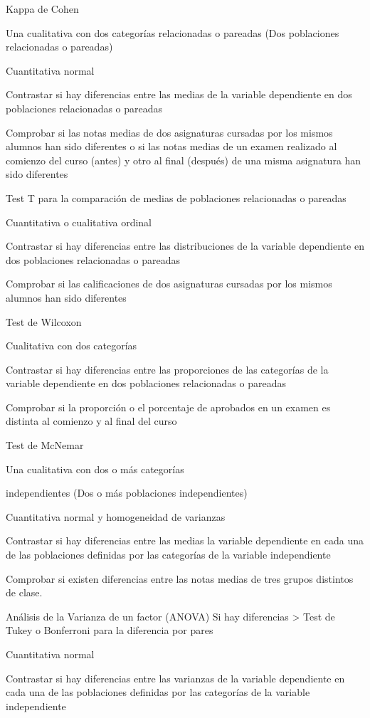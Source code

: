 \documentclass[
  a4paper,
]{scrreport}
\theoremstyle{definition}
\theoremstyle{definition}
\theoremstyle{remark}
\begin{document}
Kappa de Cohen

Una cualitativa con dos categorías relacionadas o pareadas (Dos
poblaciones relacionadas o pareadas)

Cuantitativa normal

Contrastar si hay diferencias entre las medias de la variable
dependiente en dos poblaciones relacionadas o pareadas

Comprobar si las notas medias de dos asignaturas cursadas por los mismos
alumnos han sido diferentes o si las notas medias de un examen realizado
al comienzo del curso (antes) y otro al final (después) de una misma
asignatura han sido diferentes

Test T para la comparación de medias de poblaciones relacionadas o
pareadas

Cuantitativa o cualitativa ordinal

Contrastar si hay diferencias entre las distribuciones de la variable
dependiente en dos poblaciones relacionadas o pareadas

Comprobar si las calificaciones de dos asignaturas cursadas por los
mismos alumnos han sido diferentes

Test de Wilcoxon

Cualitativa con dos categorías

Contrastar si hay diferencias entre las proporciones de las categorías
de la variable dependiente en dos poblaciones relacionadas o pareadas

Comprobar si la proporción o el porcentaje de aprobados en un examen es
distinta al comienzo y al final del curso

Test de McNemar

Una cualitativa con dos o más categorías

independientes (Dos o más poblaciones independientes)

Cuantitativa normal y homogeneidad de varianzas

Contrastar si hay diferencias entre las medias la variable dependiente
en cada una de las poblaciones definidas por las categorías de la
variable independiente

Comprobar si existen diferencias entre las notas medias de tres grupos
distintos de clase.

Análisis de la Varianza de un factor (ANOVA) Si hay diferencias
\textgreater{} Test de Tukey o Bonferroni para la diferencia por pares

Cuantitativa normal

Contrastar si hay diferencias entre las varianzas de la variable
dependiente en cada una de las poblaciones definidas por las categorías
de la variable independiente
\end{document}
